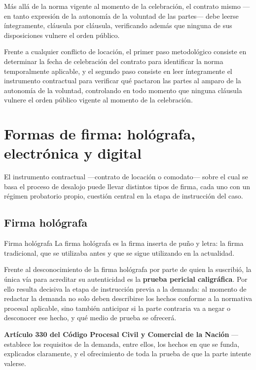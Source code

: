 \documentclass[12pt,oneside]{book}
\begin{document}
Más allá de la norma vigente al momento de la celebración, el contrato mismo ---en tanto expresión de la autonomía de la voluntad de las partes--- debe leerse íntegramente, cláusula por cláusula, verificando además que ninguna de sus disposiciones vulnere el orden público.

\begin{important}
Frente a cualquier conflicto de locación, el primer paso metodológico consiste en determinar la fecha de celebración del contrato para identificar la norma temporalmente aplicable, y el segundo paso consiste en leer íntegramente el instrumento contractual para verificar qué pactaron las partes al amparo de la autonomía de la voluntad, controlando en todo momento que ninguna cláusula vulnere el orden público vigente al momento de la celebración.
\end{important}

\section{Formas de firma: hológrafa, electrónica y digital}

El instrumento contractual ---contrato de locación o comodato--- sobre el cual se basa el proceso de desalojo puede llevar distintos tipos de firma, cada uno con un régimen probatorio propio, cuestión central en la etapa de instrucción del caso.

\subsection{Firma hológrafa}

\begin{definition}{Firma hológrafa}
La firma hológrafa es la firma inserta de puño y letra: la firma tradicional, que se utilizaba antes y que se sigue utilizando en la actualidad.
\end{definition}

Frente al desconocimiento de la firma hológrafa por parte de quien la suscribió, la única vía para acreditar su autenticidad es la \textbf{prueba pericial caligráfica}. Por ello resulta decisiva la etapa de instrucción previa a la demanda: al momento de redactar la demanda no solo deben describirse los hechos conforme a la normativa procesal aplicable, sino también anticipar si la parte contraria va a negar o desconocer ese hecho, y qué medio de prueba se ofrecerá.

\begin{normacitada}
\textbf{Artículo 330 del Código Procesal Civil y Comercial de la Nación} --- establece los requisitos de la demanda, entre ellos, los hechos en que se funda, explicados claramente, y el ofrecimiento de toda la prueba de que la parte intente valerse.
\end{normacitada}
\end{document}
